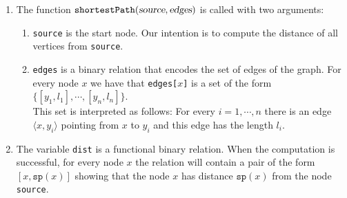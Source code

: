 \noindent
\begin{enumerate}
\item The function $\mathtt{shortestPath}(\textsl{source}, \textsl{edges})$ is called with two arguments:
      \begin{enumerate}
      \item \texttt{source} is the start node.  Our intention is to compute the distance of all
            vertices from \texttt{source}.
      \item \texttt{edges} is a binary relation that encodes the set of edges of the graph.  For
            every node $x$ we have that \texttt{edges[$x$]} is a set of the form
            \\[0.2cm]
            \hspace*{1.3cm}
            $\{ [y_1, l_1], \cdots, [y_n, l_n] \}$.
            \\[0.2cm]
            This set is interpreted as follows: For every $i = 1,\cdots,n$ there is an edge
            $\langle x, y_i \rangle$ pointing from $x$ to $y_i$ and this edge has the length $l_i$.
      \end{enumerate}
\item The variable \texttt{dist} is a functional binary relation.  When the computation is
      successful, for every node $x$ the relation will contain a pair of the form
      $[x, \mathtt{sp}(x)]$ showing that the node $x$ has distance $\mathtt{sp}(x)$ from the node \texttt{source}.


\end{enumerate}
